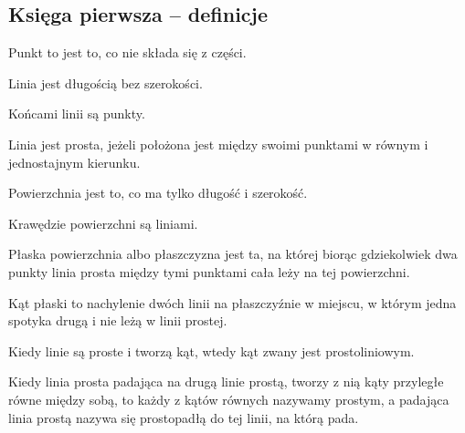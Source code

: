 \subsection{Księga pierwsza -- definicje}
\begin{euclid_definition}
    Punkt to jest to, co nie składa się z części.
\end{euclid_definition}

\begin{euclid_definition}
    Linia jest długością bez szerokości.
\end{euclid_definition}

\begin{euclid_definition}
    Końcami linii są punkty.
\end{euclid_definition}

\begin{euclid_definition}
    Linia jest prosta, jeżeli położona jest między swoimi punktami w równym i jednostajnym kierunku.
\end{euclid_definition}

\begin{euclid_definition}
    Powierzchnia jest to, co ma tylko długość i szerokość.
\end{euclid_definition}

\begin{euclid_definition}
    Krawędzie powierzchni są liniami.
\end{euclid_definition}

\begin{euclid_definition}
    Płaska powierzchnia albo płaszczyzna jest ta, na której biorąc gdziekolwiek dwa punkty linia prosta między tymi punktami cała leży na tej powierzchni.
\end{euclid_definition}

\begin{euclid_definition}
    Kąt płaski to nachylenie dwóch linii na płaszczyźnie w miejscu, w którym jedna spotyka drugą i nie leżą w linii prostej.
\end{euclid_definition}

\begin{euclid_definition}
    Kiedy linie są proste i tworzą kąt, wtedy kąt zwany jest prostoliniowym.
\end{euclid_definition}

\begin{euclid_definition}
    Kiedy linia prosta padająca na drugą linie prostą, tworzy z nią kąty przyległe równe między sobą, to każdy z kątów równych nazywamy prostym, a padająca linia prostą nazywa się prostopadłą do tej linii, na którą pada.
\end{euclid_definition}

